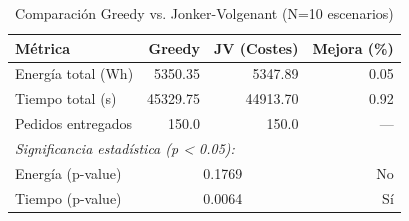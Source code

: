 \begin{table}[htbp]
\centering
\caption{Comparación Greedy vs. Jonker-Volgenant (N=10 escenarios)}
\label{tab:comparison}
\begin{tabular}{lrrr}
\hline
\textbf{Métrica} & \textbf{Greedy} & \textbf{JV (Costes)} & \textbf{Mejora (\%)} \\
\hline
Energía total (Wh) & 5350.35 & 5347.89 & 0.05 \\
Tiempo total (s) & 45329.75 & 44913.70 & 0.92 \\
Pedidos entregados & 150.0 & 150.0 & — \\
\hline
\multicolumn{4}{l}{\textit{Significancia estadística (p < 0.05):}} \\
Energía (p-value) & \multicolumn{2}{c}{0.1769} & No \\
Tiempo (p-value) & \multicolumn{2}{c}{0.0064} & Sí \\
\hline
\end{tabular}
\end{table}